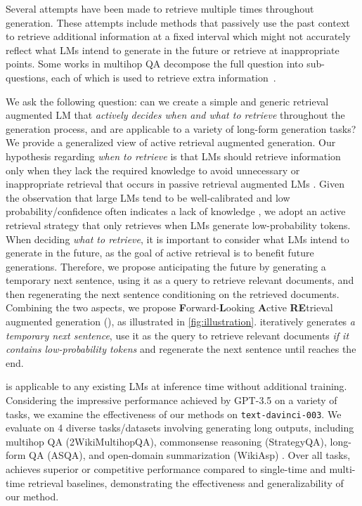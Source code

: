Several attempts have been made to retrieve multiple times throughout generation.
These attempts include methods that passively use the past context to retrieve additional information at a fixed interval \cite{knnlm-2020-khandelwal,retro-borgeaud-2022,icrlm-ram-2023,ircot-trivedi-2022} which might not accurately reflect what LMs intend to generate in the future or retrieve at inappropriate points.
Some works in multihop QA decompose the full question into sub-questions, each of which is used to retrieve extra information~\cite{selfask-press-2022,react-yao-2022,decomp-khot-2022,dsp-khattab-2022}.

We ask the following question: can we create a simple and generic retrieval augmented LM that \emph{actively decides when and what to retrieve} throughout the generation process, and are applicable to a variety of long-form generation tasks?
We provide a generalized view of active retrieval augmented generation.
Our hypothesis regarding \emph{when to retrieve} is that LMs should retrieve information only when they lack the required knowledge to avoid unnecessary or inappropriate retrieval that occurs in passive retrieval augmented LMs \cite{knnlm-2020-khandelwal,retro-borgeaud-2022,icrlm-ram-2023,ircot-trivedi-2022}.
Given the observation that large LMs tend to be well-calibrated and low probability/confidence often indicates a lack of knowledge \cite{mostlyknow-kadavath-2022}, we adopt an active retrieval strategy that only retrieves when LMs generate low-probability tokens.
When deciding \emph{what to retrieve}, it is important to consider what LMs intend to generate in the future, as the goal of active retrieval is to benefit future generations.
Therefore, we propose anticipating the future by generating a temporary next sentence, using it as a query to retrieve relevant documents, and then regenerating the next sentence conditioning on the retrieved documents.
Combining the two aspects, we propose \textbf{F}orward-\textbf{L}ooking \textbf{A}ctive \textbf{RE}trieval augmented generation (\textbf{\ours}), as illustrated in \autoref{fig:illustration}.
\ours iteratively generates \emph{a temporary next sentence}, use it as the query to retrieve relevant documents \emph{if it contains low-probability tokens} and regenerate the next sentence until reaches the end.

\ours is applicable to any existing LMs at inference time without additional training.
Considering the impressive performance achieved by GPT-3.5 \cite{instructgpt3-ouyang-2022} on a variety of tasks, we examine the effectiveness of our methods on \texttt{text-davinci-003}.
We evaluate \ours on 4 diverse tasks/datasets involving generating long outputs, including multihop QA (2WikiMultihopQA), commonsense reasoning (StrategyQA), long-form QA (ASQA), and open-domain summarization (WikiAsp) \cite{2wikimultihopqa-ho-2020,strategyqa-geva-2021,asqa-stelmakh-2022,wikiasp-hayashi-2021}.
Over all tasks, \ours achieves superior or competitive performance compared to single-time and multi-time retrieval baselines, demonstrating the effectiveness and generalizability of our method.

